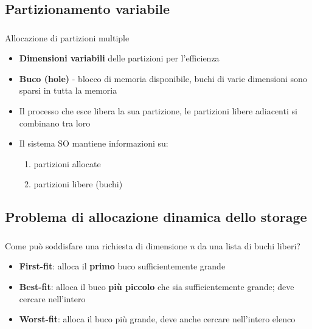 \documentclass{beamer}
\newenvironment{mainframe}{
	\begin{frame}
		\frametitle{\insertsubsection}
		\framesubtitle{\insertsection}
	}{
	\end{frame}
}
\begin{document}
\subsection{Partizionamento variabile}
\begin{mainframe}
	Allocazione di partizioni multiple
	\begin{itemize}
		\item \textbf{Dimensioni variabili} delle partizioni per l'efficienza
		\item \textbf{Buco (hole)} - blocco di memoria disponibile, buchi di varie dimensioni sono sparsi in tutta la memoria
		\item Il processo che esce libera la sua partizione, le partizioni libere adiacenti si combinano tra loro
		\item Il sistema SO mantiene informazioni su:
		\begin{enumerate}
			\item partizioni allocate
			\item partizioni libere (buchi)
		\end{enumerate}
	\end{itemize}
\end{mainframe}
\subsection{Problema di allocazione dinamica dello storage}
\begin{mainframe}
	Come può soddisfare una richiesta di dimensione \textit{n} da una lista di buchi liberi?
	\begin{itemize}
		\item \textbf{First-fit}: alloca il \textbf{primo} buco sufficientemente grande
		\item \textbf{Best-fit}: alloca il buco \textbf{più piccolo} che sia sufficientemente grande; deve cercare nell'intero
		\item \textbf{Worst-fit}: alloca il buco più grande, deve anche cercare nell'intero elenco
	\end{itemize}
\end{mainframe}
\end{document}
